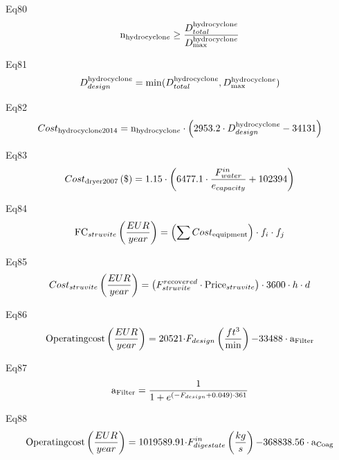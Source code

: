 \documentclass[10pt,a4paper]{article}
\begin{document}
Eq80
\begin{align}
	{{\rm{n}}_{{\rm{hydrocyclon}}e}} \ge \frac{{D_{total}^{{\rm{hydrocyclon}}e}}}{{D_{{\rm{max}}}^{{\rm{hydrocyclon}}e}}}
\end{align}

Eq81
\begin{align}
	D_{design}^{{\rm{hydrocyclon}}e} = \min (D_{total}^{{\rm{hydrocyclon}}e},D_{{\rm{max}}}^{{\rm{hydrocyclon}}e})
\end{align}

Eq82
\begin{align}
	Cos{t_{{\rm{hydrocyclone 2014}}}} = {{\rm{n}}_{{\rm{hydrocyclon}}e}} \cdot \left( {{\rm{2953}}{\rm{.2}} \cdot D_{design}^{{\rm{hydrocyclon}}e} - {\rm{34131}}} \right)
\end{align}

Eq83
\begin{align}
	Cos{t_{{\rm{dryer 2007}}}}\left( \$  \right) = 1.15 \cdot \left( {6477.1 \cdot \frac{{F_{water}^{in}}}{{{e_{capacity}}}} + 102394} \right)
\end{align}

Eq84
\begin{align}
	{\rm{F}}{{\rm{C}}_{struvite}}\left( {\frac{EUR }{{year}}} \right) = \left( {\sum {Cos{t_{{\rm{equipment}}}}} } \right) \cdot {f_i}\cdot{f_j}
\end{align}

Eq85
\begin{align}
	Cos{t_{struvite}}\left( {\frac{EUR }{{year}}} \right) = \left( {F_{struvite}^{re{\mathop{\rm cov}} ered}\cdot{\rm{Pric}}{{\rm{e}}_{struvite}}} \right) \cdot 3600\cdot h \cdot d
\end{align}

Eq86
\begin{align}
	{\rm{Operating cost}}\left( {\frac{EUR }{{year}}} \right) = {\rm{20521\cdot}}{F_{design}}\left( {\frac{{f{t^3}}}{{\min }}} \right){\rm{ -  33488}} \cdot {{\rm{a}}_{{\rm{Filter}}}}
\end{align}

Eq87
\begin{align}
	{{\rm{a}}_{{\rm{Filter}}}} = \frac{1}{{1 + {e^{\left( { - {F_{design}} + {\rm{0}}{\rm{.049}}} \right) \cdot {\rm{361}}}}}}
\end{align}

Eq88
\begin{align}
	{\rm{Operating cost}}\left( {\frac{EUR }{{year}}} \right) = {\rm{1019589}}{\rm{.91\cdot}}F_{digestate}^{in}\left( {\frac{{kg}}{s}} \right){\rm{ -  368838}}{\rm{.56}} \cdot {{\rm{a}}_{{\rm{Coag}}}}
\end{align}
\end{document}
